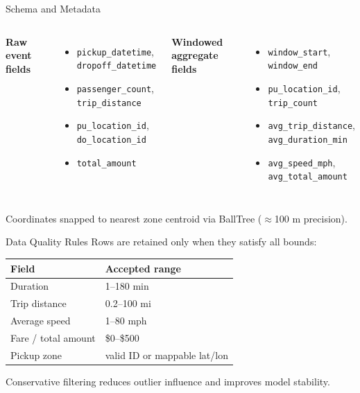 \documentclass[aspectratio=169,professionalfonts]{beamer}
\begin{document}
\begin{frame}{Schema and Metadata}
\begin{columns}[T]
\textbf{Raw event fields}
\begin{itemize}
  \item \texttt{pickup\_datetime}, \texttt{dropoff\_datetime}
  \item \texttt{passenger\_count}, \texttt{trip\_distance}
  \item \texttt{pu\_location\_id}, \texttt{do\_location\_id}
  \item \texttt{total\_amount}
\end{itemize}

\textbf{Windowed aggregate fields}
\begin{itemize}
  \item \texttt{window\_start}, \texttt{window\_end}
  \item \texttt{pu\_location\_id}, \texttt{trip\_count}
  \item \texttt{avg\_trip\_distance}, \texttt{avg\_duration\_min}
  \item \texttt{avg\_speed\_mph}, \texttt{avg\_total\_amount}
\end{itemize}
\end{columns}

\vspace{0.6em}
Coordinates snapped to nearest zone centroid via
BallTree ($\approx$100 m precision).
\end{frame}

\begin{frame}{Data Quality Rules}
Rows are retained only when they satisfy all bounds:

\vspace{0.4em}
\begin{center}
\begin{tabular}{ll}
\toprule
Field & Accepted range \\
\midrule
Duration & 1--180 min \\
Trip distance & 0.2--100 mi \\
Average speed & 1--80 mph \\
Fare / total amount & \$0--\$500 \\
Pickup zone & valid ID or mappable lat/lon \\
\bottomrule
\end{tabular}
\end{center}

\vspace{0.4em}
Conservative filtering reduces outlier influence and improves model stability.
\end{frame}
\end{document}
